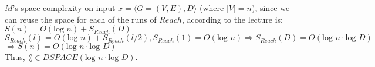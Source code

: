 $M$'s space complexity on input $x=\langle G = (V,E), D \rangle$ (where $|V|=n$), since we can reuse the space for each of the runs of $Reach$, according to the lecture is: \\
$S(n) = O(\text{log }n) + S_{Reach}(D)$ \\
$S_{Reach}(l) = O(\text{log }n) + S_{Reach}(l/2), S_{Reach}(1) = O(\text{log }n) \Rightarrow S_{Reach}(D) = O(\text{log }n \cdot \text{log }D)$ \\
$\Longrightarrow S(n) = O(\text{log }n \cdot \text{log }D)$ \\
Thus, $\lang \in DSPACE(\text{log }n \cdot \text{log }D)$.
